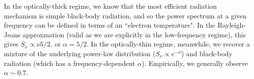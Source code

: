 \pg
In the optically-thick regime, we know that the most efficient radiation mechanism is simple black-body radiation, and so the power spectrum at a given frequency can be defined in terms of an ``electron temperature". In the Rayleigh-Jeans approxmation (valid as we are explicitly in the low-frequency regime), this gives $S_\nu \propto \nu{5/2}$, or $\alpha=5/2$. 
In the optically-thin regime, meanwhile, we recover a mixture of the underlying power-law distribution ($S_\nu \propto e^{-\nu}$) and black-body radiation (which has a frequency-dependent $\alpha$). Empirically, we generally observe $\alpha \sim 0.7$.


%

